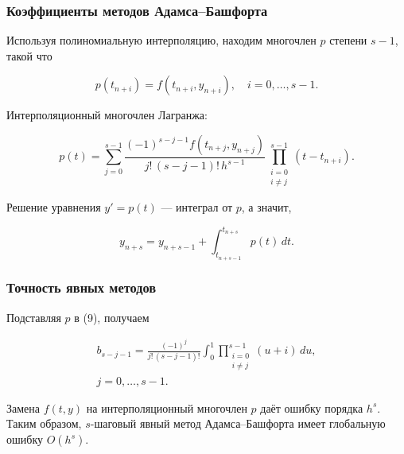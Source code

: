 \begin{frame}
\frametitle{Коэффициенты методов Адамса--Башфорта}

Используя полиномиальную интерполяцию, находим многочлен $ p $ степени $ s - 1 $, такой что

\su
\begin{equation}
  p(t_{n+i}) = f(t_{n+i}, y_{n+i}), \quad i = 0, \ldots, s - 1.
\end{equation}

Интерполяционный многочлен Лагранжа:

\su
\begin{equation}
  p(t) = \sum_{j=0}^{s-1} \frac{(-1)^{s-j-1} f(t_{n+j}, y_{n+j})}{j! \, (s-j-1)! \, h^{s-1}} \prod_{\substack{i=0 \\ i \neq j}}^{s-1}(t - t_{n+i}).
\end{equation}

Решение уравнения $ y' = p(t) $ --- интеграл от $ p $, а значит,

\su
\begin{equation}
  y_{n+s} = y_{n+s-1} + \int_{t_{n+s-1}}^{t_{n+s}} p(t) \, dt.
\end{equation}

\end{frame}

\begin{frame}
\frametitle{Точность явных методов}

Подставляя $ p $ в (9), получаем

\su
\begin{equation}
\begin{gathered}
  b_{s-j-1} = \frac{(-1)^j}{j! \, (s-j-1)!} \int_0^1 \prod_{\substack{i=0 \\ i \neq j}}^{s-1}(u + i) \, du, \\
  j = 0, \ldots, s - 1.
\end{gathered}
\end{equation}

Замена $ f(t, y) $ на интерполяционный многочлен $ p $ даёт ошибку порядка $ h^s $. Таким образом, $s$-шаговый явный метод Адамса--Башфорта имеет глобальную ошибку $ O(h^s) $.

\end{frame}

